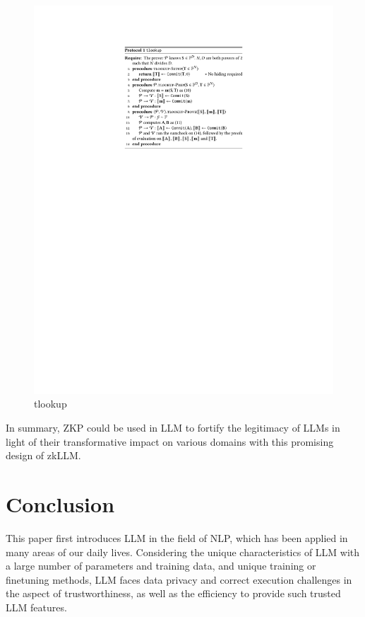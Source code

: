 \documentclass[lang=en]{sjtuarticle}
\begin{document}
\begin{figure}[h]
\begin{minipage}{.55\textwidth}
        \includegraphics{tlookup.pdf}
        \caption{\textsf{tlookup}}
        \label{fig:tlookup}
    \end{minipage}
\end{figure}

In summary, ZKP could be used in LLM to fortify the legitimacy of LLMs
in light of their transformative impact on various domains with this promising design of zkLLM.

\section{Conclusion}

This paper first introduces LLM in the field of NLP, which has been applied in many areas of our daily lives. Considering the unique characteristics of LLM with a large number of parameters and training data, and unique training or finetuning methods, LLM faces data privacy and correct execution challenges in the aspect of trustworthiness, as well as the efficiency to provide such trusted LLM features.
\end{document}
